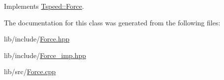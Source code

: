 Implements \hyperlink{classTspeed_1_1Force_ac174525b11c7c6a490411d00330a3564}{Tspeed\-::\-Force}.



The documentation for this class was generated from the following files\-:\begin{DoxyCompactItemize}
\item 
lib/include/\hyperlink{Force_8hpp}{Force.\-hpp}\item 
lib/include/\hyperlink{Force__imp_8hpp}{Force\-\_\-imp.\-hpp}\item 
lib/src/\hyperlink{Force_8cpp}{Force.\-cpp}\end{DoxyCompactItemize}
